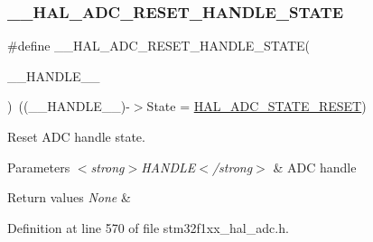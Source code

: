 \subsubsection{\texorpdfstring{\+\_\+\+\_\+\+H\+A\+L\+\_\+\+A\+D\+C\+\_\+\+R\+E\+S\+E\+T\+\_\+\+H\+A\+N\+D\+L\+E\+\_\+\+S\+T\+A\+TE}{\_\_HAL\_ADC\_RESET\_HANDLE\_STATE}}
{\footnotesize\ttfamily \#define \+\_\+\+\_\+\+H\+A\+L\+\_\+\+A\+D\+C\+\_\+\+R\+E\+S\+E\+T\+\_\+\+H\+A\+N\+D\+L\+E\+\_\+\+S\+T\+A\+TE(\begin{DoxyParamCaption}\item[{}]{\+\_\+\+\_\+\+H\+A\+N\+D\+L\+E\+\_\+\+\_\+ }\end{DoxyParamCaption})~((\+\_\+\+\_\+\+H\+A\+N\+D\+L\+E\+\_\+\+\_\+)-\/$>$State = \hyperlink{group___a_d_c___exported___types_ga3f995b6dedd7366d0663f852511b9104}{H\+A\+L\+\_\+\+A\+D\+C\+\_\+\+S\+T\+A\+T\+E\+\_\+\+R\+E\+S\+ET})}



Reset A\+DC handle state. 


\begin{DoxyParams}{Parameters}
{\em $<$strong$>$\+H\+A\+N\+D\+L\+E$<$/strong$>$} & A\+DC handle \\
\hline
\end{DoxyParams}

\begin{DoxyRetVals}{Return values}
{\em None} & \\
\hline
\end{DoxyRetVals}


Definition at line 570 of file stm32f1xx\+\_\+hal\+\_\+adc.\+h.

